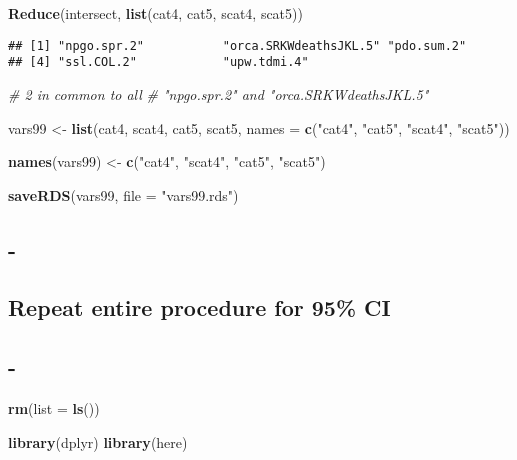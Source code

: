 \documentclass[]{article}
\newenvironment{Shaded}{\begin{snugshade}}{\end{snugshade}}
\newcommand{\KeywordTok}[1]{\textcolor[rgb]{0.13,0.29,0.53}{\textbf{{#1}}}}
\newcommand{\DataTypeTok}[1]{\textcolor[rgb]{0.13,0.29,0.53}{{#1}}}
\newcommand{\StringTok}[1]{\textcolor[rgb]{0.31,0.60,0.02}{{#1}}}
\newcommand{\CommentTok}[1]{\textcolor[rgb]{0.56,0.35,0.01}{\textit{{#1}}}}
\newcommand{\NormalTok}[1]{{#1}}
\begin{document}
\begin{Shaded}
\begin{Highlighting}[]
\KeywordTok{Reduce}\NormalTok{(intersect, }\KeywordTok{list}\NormalTok{(cat4, cat5, scat4, scat5))}
\end{Highlighting}
\end{Shaded}

\begin{verbatim}
## [1] "npgo.spr.2"           "orca.SRKWdeathsJKL.5" "pdo.sum.2"           
## [4] "ssl.COL.2"            "upw.tdmi.4"
\end{verbatim}

\begin{Shaded}
\begin{Highlighting}[]
\CommentTok{# 2 in common to all}
\CommentTok{# "npgo.spr.2" and "orca.SRKWdeathsJKL.5"}


\NormalTok{vars99 <-}\StringTok{ }\KeywordTok{list}\NormalTok{(cat4, scat4, cat5, scat5, }\DataTypeTok{names =} \KeywordTok{c}\NormalTok{(}\StringTok{"cat4"}\NormalTok{, }\StringTok{"cat5"}\NormalTok{, }\StringTok{"scat4"}\NormalTok{, }\StringTok{"scat5"}\NormalTok{))}

\KeywordTok{names}\NormalTok{(vars99) <-}\StringTok{ }\KeywordTok{c}\NormalTok{(}\StringTok{"cat4"}\NormalTok{, }\StringTok{"scat4"}\NormalTok{, }\StringTok{"cat5"}\NormalTok{, }\StringTok{"scat5"}\NormalTok{)}

\KeywordTok{saveRDS}\NormalTok{(vars99, }\DataTypeTok{file =} \StringTok{"vars99.rds"}\NormalTok{)}
\end{Highlighting}
\end{Shaded}

\subsection{-}\label{section}

\subsection{Repeat entire procedure for 95\%
CI}\label{repeat-entire-procedure-for-95-ci}

\subsection{-}\label{section-1}

\begin{Shaded}
\begin{Highlighting}[]
\KeywordTok{rm}\NormalTok{(}\DataTypeTok{list =} \KeywordTok{ls}\NormalTok{())}

\KeywordTok{library}\NormalTok{(dplyr)}
\KeywordTok{library}\NormalTok{(here)}
\end{Highlighting}
\end{Shaded}
\end{document}
